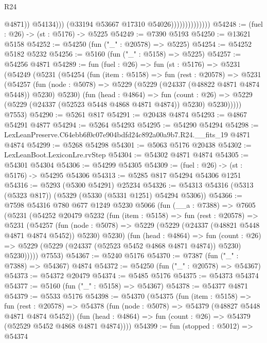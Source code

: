\begin{lexlean}{R24}
\begin{coremodule}
                                        @4871))
                                    @54134)))
                              (@33194 @53667 @17310 @54026))))))))))))))
@54248 := (fuel : @26) -> (st : @5176) -> @5225
@54249 := @7390 @5193
@54250 := @13621 @5158
@54252 := @54250 (fun ("_" : @20578) => @5225)
@54254 := @54252 @5182 @5232
@54256 := @5160 (fun ("_" : @5158) => @5225)
@54257 := @54256 @4871
@54289 := fun (fuel : @26) =>
  fun (st : @5176) =>
  @5231
    (@54249
      (@5231
        (@54254
          (fun (item : @5158) =>
          fun (rest : @20578) =>
          @5231
            (@54257
              (fun (node : @5078) => @5229 (@5229 (@24337 (@48822 @4871 @4874 @5448)) @5230) @5230)
              (fun (head : @4864) =>
              fun (count : @26) =>
              @5229 (@5229 (@24337 (@52523 @5448 @4868 @4871 @4874)) @5230) @5230)))))
      @7553)
@54290 := @5261 @817
@54291 := @20438 @4874
@54293 := @4867 @54291 @4877
@54294 := @5264 @54293
@54295 := @54290 @54294
@54298 := LexLeanPreserve.C64ebb6f0c07e904bdfd24c892a00a9b7.R24.__fits_19 @4871 @4874
@54299 := @5268 @54298
@54301 := @5063 @5176 @20438
@54302 := LexLeanBoot.LexiconLre.rvStep
@54304 := @54302 @4871 @4874
@54305 := @54301 @54304
@54306 := @54299 @54305
@54309 := (fuel : @26) -> (st : @5176) -> @54295 @54306
@54313 := @5285 @817 @54294 @54306 @1251
@54316 := @5293 (@5300 @54291) @25234
@54326 := @54313 @54316 (@5313 (@5323 @817)) (@5329 (@5330 (@5331 @1251) @54294 @5306))
@54366 := @7598
    @54316
    @780
    @677
    @1249
    @5230
    @5066
    (fun (__a : @7388) =>
    @7605
      (@5231
        (@54252
          @20479
          @5232
          (fun (item : @5158) =>
          fun (rest : @20578) =>
          @5231
            (@54257
              (fun (node : @5078) =>
              @5229 (@5229 (@24337 (@48821 @5448 @4871 @4874 @5452)) @5230) @5230)
              (fun (head : @4864) =>
              fun (count : @26) =>
              @5229 (@5229 (@24337 (@52523 @5452 @4868 @4871 @4874)) @5230) @5230)))))
      @7553)
@54367 := @5240 @5176
@54370 := @7387 (fun ("_" : @7388) => @54367) @4874
@54372 := @54250 (fun ("_" : @20578) => @54367)
@54373 := @54372 @20479
@54374 := @5485 @5176
@54375 := @54373 @54374
@54377 := @5160 (fun ("_" : @5158) => @54367)
@54378 := @54377 @4871
@54379 := @5533 @5176
@54398 := @54370
    (@54375
      (fun (item : @5158) =>
      fun (rest : @20578) =>
      @54378
        (fun (node : @5078) => @54379 (@48827 @5448 @4871 @4874 @5452))
        (fun (head : @4864) => fun (count : @26) => @54379 (@52529 @5452 @4868 @4871 @4874))))
@54399 := fun (stopped : @5012) => @54374

\end{coremodule}
\end{lexlean}
